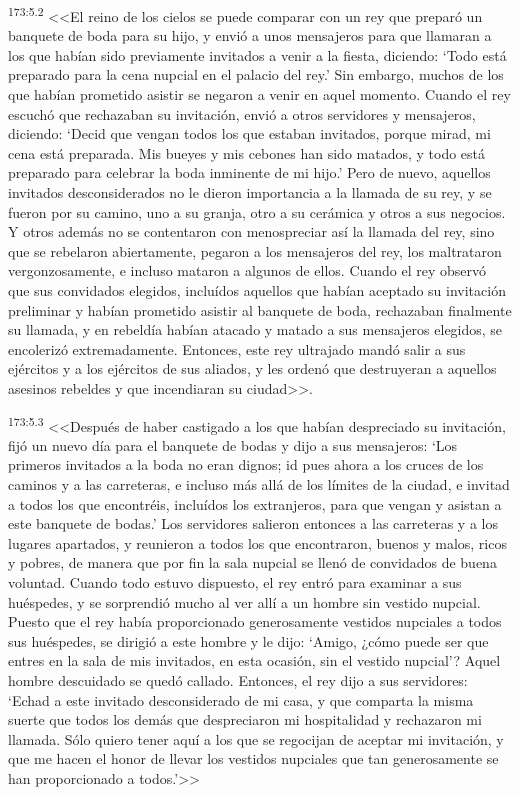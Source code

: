 \par 
\textsuperscript{173:5.2} <<El reino de los cielos se puede comparar con un rey que preparó un banquete de boda para su hijo, y envió a unos mensajeros para que llamaran a los que habían sido previamente invitados a venir a la fiesta, diciendo: `Todo está preparado para la cena nupcial en el palacio del rey.' Sin embargo, muchos de los que habían prometido asistir se negaron a venir en aquel momento. Cuando el rey escuchó que rechazaban su invitación, envió a otros servidores y mensajeros, diciendo: `Decid que vengan todos los que estaban invitados, porque mirad, mi cena está preparada. Mis bueyes y mis cebones han sido matados, y todo está preparado para celebrar la boda inminente de mi hijo.' Pero de nuevo, aquellos invitados desconsiderados no le dieron importancia a la llamada de su rey, y se fueron por su camino, uno a su granja, otro a su cerámica y otros a sus negocios. Y otros además no se contentaron con menospreciar así la llamada del rey, sino que se rebelaron abiertamente, pegaron a los mensajeros del rey, los maltrataron vergonzosamente, e incluso mataron a algunos de ellos. Cuando el rey observó que sus convidados elegidos, incluídos aquellos que habían aceptado su invitación preliminar y habían prometido asistir al banquete de boda, rechazaban finalmente su llamada, y en rebeldía habían atacado y matado a sus mensajeros elegidos, se encolerizó extremadamente. Entonces, este rey ultrajado mandó salir a sus ejércitos y a los ejércitos de sus aliados, y les ordenó que destruyeran a aquellos asesinos rebeldes y que incendiaran su ciudad>>.

\par 
\textsuperscript{173:5.3} <<Después de haber castigado a los que habían despreciado su invitación, fijó un nuevo día para el banquete de bodas y dijo a sus mensajeros: `Los primeros invitados a la boda no eran dignos; id pues ahora a los cruces de los caminos y a las carreteras, e incluso más allá de los límites de la ciudad, e invitad a todos los que encontréis, incluídos los extranjeros, para que vengan y asistan a este banquete de bodas.' Los servidores salieron entonces a las carreteras y a los lugares apartados, y reunieron a todos los que encontraron, buenos y malos, ricos y pobres, de manera que por fin la sala nupcial se llenó de convidados de buena voluntad. Cuando todo estuvo dispuesto, el rey entró para examinar a sus huéspedes, y se sorprendió mucho al ver allí a un hombre sin vestido nupcial. Puesto que el rey había proporcionado generosamente vestidos nupciales a todos sus huéspedes, se dirigió a este hombre y le dijo: `Amigo, ¿cómo puede ser que entres en la sala de mis invitados, en esta ocasión, sin el vestido nupcial'? Aquel hombre descuidado se quedó callado. Entonces, el rey dijo a sus servidores: `Echad a este invitado desconsiderado de mi casa, y que comparta la misma suerte que todos los demás que despreciaron mi hospitalidad y rechazaron mi llamada. Sólo quiero tener aquí a los que se regocijan de aceptar mi invitación, y que me hacen el honor de llevar los vestidos nupciales que tan generosamente se han proporcionado a todos.'>>

